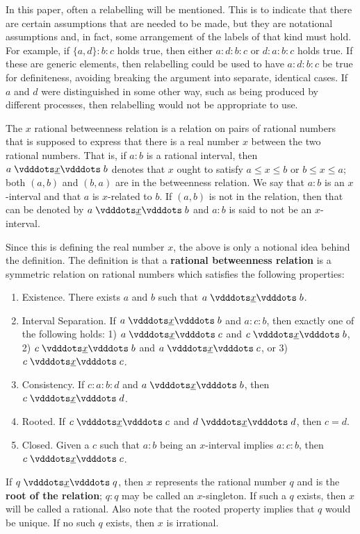 \documentclass[12pt]{article}
\begin{document}
In this paper, often a relabelling will be mentioned. This is to indicate that there are certain assumptions that are needed to be made, but they are notational assumptions and, in fact, some arrangement of the labels of that kind must hold. For example, if $\{a,d\}:b:c$ holds true, then either $a:d:b:c$ or $d:a:b:c$ holds true. If these are generic elements, then relabelling could be used to have $a:d:b:c$  be  true for definiteness, avoiding breaking the argument into separate, identical cases. If $a$ and $d$ were distinguished in some other way, such as being produced by different processes, then relabelling would not be appropriate to use. 

The $x$ rational betweenness relation is a relation on pairs of rational numbers that is supposed to express that there is a real number $x$ between the two rational numbers. That is, if $a : b$ is a rational interval, then $a \xrel b$ denotes that $x$ ought to satisfy $a \leq x \leq b$ or $b \leq x \leq a$;  both $(a,b)$ and $(b,a)$ are in the betweenness relation. We say that $a:b$ is an $x$-interval and that $a$ is $x$-related to $b$. If $(a,b)$ is not in the relation, then that can be denoted by \sout{$a \xrel b$} and $a:b$ is said to not be an $x$-interval. 

Since this is defining the real number $x$, the above is only a notional idea behind the definition. The definition is that a \textbf{rational betweenness relation} is a symmetric relation on rational numbers 
which satisfies the following properties:
\begin{enumerate}
    \item Existence. There exists $a$ and $b$ such that $a\xrel b$.
    \item Interval Separation. If $a \xrel b$ and $a : c : b$, then exactly one of the following holds: 1) $a \xrel c$ and \sout{$c \xrel b$}, 2) $c \xrel b$ and \sout{$a \xrel c$}, or 3) $c \xrel c$. 
    \item Consistency. If $c : a : b : d$ and $a \xrel b$, then $c \xrel d$. 
    \item Rooted. If $c \xrel c$ and $d \xrel d$, then $c=d$. 
    \item Closed. Given a $c$ such that $a:b$ being an $x$-interval implies $a:c:b$, then $c \xrel c$. 
\end{enumerate}

If $q \xrel q$, then $x$ represents the rational number $q$ and is the \textbf{root of the relation}; $q:q$ may be called an $x$-singleton. If such a $q$ exists, then $x$ will be called a rational. Also note that the rooted property implies that $q$ would be unique. If no such $q$ exists, then $x$ is irrational. 
\end{document}
